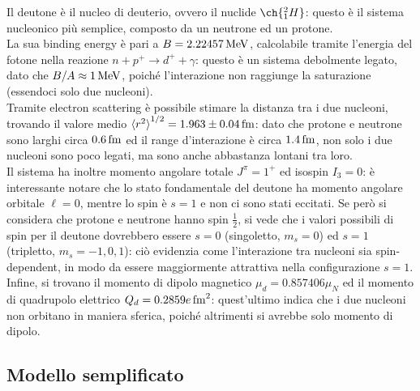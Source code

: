 Il deutone è il nucleo di deuterio, ovvero il nuclide $ \ch{^2_1 H} $: questo è il sistema nucleonico più semplice, composto da un neutrone ed un protone.\\
La sua binding energy è pari a $ B = 2.22457\,\mathrm{MeV} $, calcolabile tramite l'energia del fotone nella reazione $ n + p^+ \rightarrow d^+ + \gamma $: questo è un sistema debolmente legato, dato che $ B / A \approx 1 \,\mathrm{MeV} $, poiché l'interazione non raggiunge la saturazione (essendoci solo due nucleoni).\\
Tramite electron scattering è possibile stimare la distanza tra i due nucleoni, trovando il valore medio $ \braket{r^2}^{1/2} = 1.963 \pm 0.04 \,\mathrm{fm} $: dato che protone e neutrone sono larghi circa $ 0.6\,\mathrm{fm} $ ed il range d'interazione è circa $ 1.4\,\mathrm{fm} $, non solo i due nucleoni sono poco legati, ma sono anche abbastanza lontani tra loro.\\
Il sistema ha inoltre momento angolare totale $ J^{\pi} = 1^+ $ ed isospin $ I_3 = 0 $: è interessante notare che lo stato fondamentale del deutone ha momento angolare orbitale $ \ell = 0 $, mentre lo spin è $ s = 1 $ e non ci sono stati eccitati. Se però si considera che protone e neutrone hanno spin $ \frac{1}{2} $, si vede che i valori possibili di spin per il deutone dovrebbero essere $ s = 0 $ (singoletto, $ m_s = 0 $) ed $ s = 1 $ (tripletto, $ m_s = -1,0,1 $): ciò evidenzia come l'interazione tra nucleoni sia spin-dependent, in modo da essere maggiormente attrattiva nella configurazione $ s = 1 $.\\
Infine, si trovano il momento di dipolo magnetico $ \mu_d = 0.857406 \mu_N $ ed il momento di quadrupolo elettrico $ Q_d = 0.2859 e \,\mathrm{fm}^2 $: quest'ultimo indica che i due nucleoni non orbitano in maniera sferica, poiché altrimenti si avrebbe solo momento di dipolo.

\subsection{Modello semplificato}

